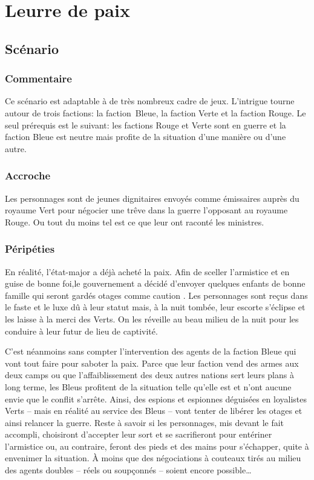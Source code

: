 \chapter{Leurre de paix}

\section{Scénario}

\subsection{Commentaire}

Ce scénario est adaptable à de très nombreux cadre de jeux.
L'intrigue tourne autour de trois factions: la faction Bleue, la faction Verte et la faction Rouge.
Le seul prérequis est le suivant: les factions Rouge et Verte sont en guerre et la faction Bleue est \og neutre \fg mais profite de la situation d'une manière ou d'une autre.

\subsection{Accroche}

Les personnages sont de jeunes dignitaires envoyés comme émissaires auprès du royaume Vert pour négocier une trêve dans la guerre l'opposant au royaume Rouge.
Ou tout du moins tel est ce que leur ont raconté les ministres.

\subsection{Péripéties}

En réalité, l'état-major a déjà acheté la paix.
Afin de sceller l'armistice et en guise de bonne foi,le gouvernement a décidé d'envoyer quelques enfants de bonne famille qui seront gardés otages comme \og caution \fg.
Les personnages sont reçus dans le faste et le luxe dû à leur statut mais, à la nuit tombée, leur escorte s'éclipse et les laisse à la merci des Verts.
On les réveille au beau milieu de la nuit pour les conduire à leur futur de lieu de captivité.

C'est néanmoins sans compter l'intervention des agents de la faction Bleue qui vont tout faire pour saboter la paix.
Parce que leur faction vend des armes aux deux camps ou que l'affaiblissement des deux autres nations sert leurs plans à long terme, les Bleus profitent de la situation telle qu'elle est et n'ont aucune envie que le conflit s'arrête.
Ainsi, des espions et espionnes déguisées en loyalistes Verts -- mais en réalité au service des Bleus -- vont tenter de libérer les otages et ainsi relancer la guerre.
Reste à savoir si les personnages, mis devant le fait accompli, choisiront d'accepter leur sort et se sacrifieront pour entériner l'armistice ou, au contraire, feront des pieds et des mains pour s'échapper, quite à envenimer la situation.
À moins que des négociations à couteaux tirés au milieu des agents doubles -- réels ou soupçonnés -- soient encore possible\dots

